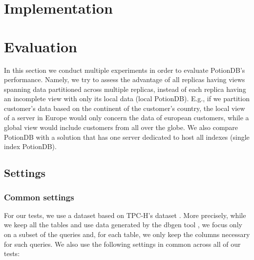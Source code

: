 \documentclass{vldb}
\begin{document}
%


\section{Implementation}

\section{Evaluation}

In this section we conduct multiple experiments in order to evaluate PotionDB's performance.
Namely, we try to assess the advantage of all replicas having views spanning data partitioned across multiple replicas, instead of each replica having an incomplete view with only its local data (local PotionDB).
E.g., if we partition customer's data based on the continent of the customer's country, the local view of a server in Europe would only concern the data of european customers, while a global view would include customers from all over the globe.
We also compare PotionDB with a solution that has one server dedicated to host all indexes (single index PotionDB).

\subsection{Settings}

\subsubsection{Common settings}

For our tests, we use a dataset based on TPC-H's dataset \cite{tpch}.
More precisely, while we keep all the tables and use data generated by the dbgen tool \cite{tpch}, we focus only on a subset of the queries and, for each table, we only keep the columns necessary for such queries.
We also use the following settings in common across all of our tests:
\end{document}
